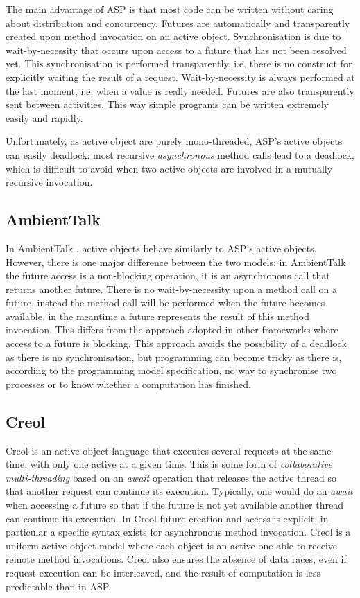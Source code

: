 \smallskip

The main advantage of ASP is that most code can be written without
caring about distribution and concurrency.  Futures are automatically
and transparently created upon method invocation on an active object.
Synchronisation is due to wait-by-necessity that occurs
upon access to a future that has not been resolved yet.
This synchronisation is performed transparently, i.e. 
there is no  construct for explicitly waiting the result of
a request. Wait-by-necessity is always
performed at the last moment, i.e. when a value is really needed.
Futures are also transparently sent between activities. This
way simple programs can be written extremely easily and rapidly.

Unfortunately, as active object are purely mono-threaded,
ASP's active objects can easily deadlock: most recursive
\emph{asynchronous} method calls lead to a deadlock, which is
difficult to avoid when two active objects are involved in a mutually
recursive invocation. 


\subsection{AmbientTalk}
In AmbientTalk \cite{DedeckerCMDM-ecoop06}, active objects behave
similarly to ASP's active objects. However, there is one major difference
between the two models: in AmbientTalk the future access is a
non-blocking operation, it is an asynchronous call that returns
another future.  There is no wait-by-necessity upon a method call on a
future, instead the method call will be performed when the future
becomes available, in the meantime a future represents the result of
this method invocation.  This differs from the approach adopted in
other frameworks where access to a future is blocking.  This approach
avoids the possibility of a deadlock as there is no synchronisation,
but programming can become tricky as there is, according to the
programming model specification, no way to synchronise two processes
or to know whether a computation has finished.



\subsection{Creol}
Creol \cite{Johnsen2006a,Elinar2006} is an active object language that executes
several requests at the same time, with only one active at a given
time. This is some form of \emph{collaborative multi-threading} based
on an \emph{await} operation that releases the active thread so that
another request can continue its execution. Typically, one would do an
\emph{await} when accessing a future so that if the future is not yet
available another thread can continue its execution. In Creol
\cite{Johnsen2006a} future creation and access is explicit, in
particular a specific syntax exists for asynchronous method
invocation. Creol is a uniform active object model where each object
is an active one able to receive remote method invocations.  Creol
also ensures the absence of data races,
even if
request execution can be interleaved, and the result of computation is
less predictable than in ASP. 


